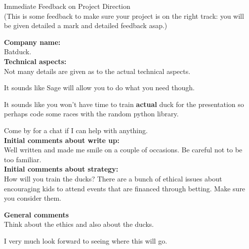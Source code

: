 \documentclass{article}
\begin{document}
\begin{center}
\Huge{Immediate Feedback on Project Direction}\\
\tiny{(This is some feedback to make sure your project is on the right track: you will be given detailed a mark and detailed feedback asap.)}
\end{center}


\normalsize
\textbf{Company name:}\\

Batduck. \\

\textbf{Technical aspects:}\\

Not many details are given as to the actual technical aspects.

It sounds like Sage will allow you to do what you need though.

It sounds like you won't have time to train \textbf{actual} duck for the presentation so perhaps code some races with the random python library.

Come by for a chat if I can help with anything.\\

\textbf{Initial comments about write up:}\\

Well written and made me smile on a couple of occasions.
Be careful not to be too familiar.\\

\textbf{Initial comments about strategy:}\\

How will you train the ducks?
There are a bunch of ethical issues about encouraging kids to attend events that are financed through betting.
Make sure you consider them.

\textbf{General comments}\\

Think about the ethics and also about the ducks.

I very much look forward to seeing where this will go.
\end{document}
